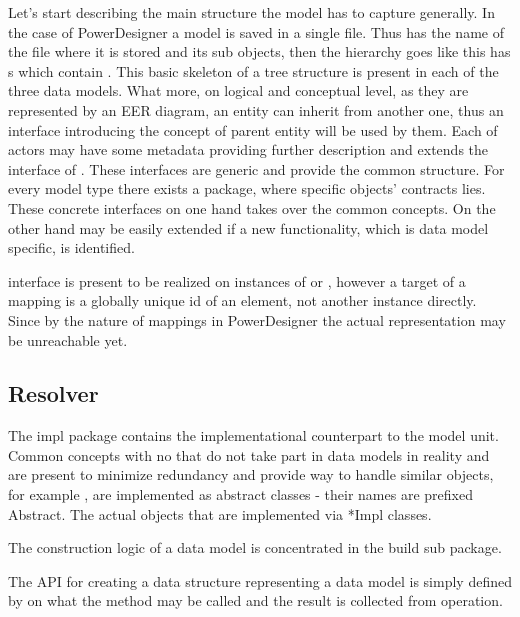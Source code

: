 Let's start describing the main structure the model has to capture generally.
In the case of PowerDesigner a model is saved in a single file. 
Thus  has the name of the file where it is stored and its sub objects, then the hierarchy goes like this  has s which contain .
This basic skeleton of a tree structure is present in each of the three data models. What more, on logical and conceptual level, as they are represented by an EER diagram, an entity can inherit from another one, thus an interface  introducing the concept of parent entity will be used by them. Each of actors may have some metadata providing further description and extends the interface of .
These interfaces are generic and provide the common structure.
For every model type there exists a package, where specific objects' contracts lies. These concrete interfaces on one hand takes over the common concepts. On the other hand may be easily extended if a new functionality, which is data model specific, is identified.

 interface is present to be realized on instances of  or  , however a target of a mapping is a globally unique id of an element, not another instance directly. Since by the nature of mappings in PowerDesigner the actual representation may be unreachable yet.

\subsection{Resolver}

The impl package contains the implementational counterpart to the model unit.
Common concepts with no that do not take part in data models in reality and are present to minimize redundancy and provide way to handle similar objects, for example , are implemented as abstract classes - their names are prefixed Abstract. The actual objects that are implemented via *Impl classes.

The construction logic of a data model is concentrated in the build sub package.

The API for creating a data structure representing a data model is simply defined by  on what the method  may be called and the result is collected from  operation.

